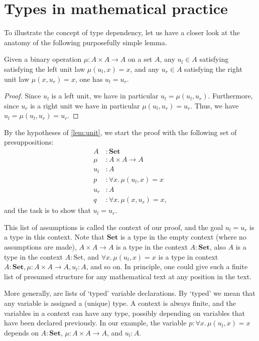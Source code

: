 \section{Types in mathematical practice}


To illustrate the concept of type dependency, let us have a closer look at the anatomy of the following purposefully simple lemma.

\begin{lem}\label{lem:unit}
Given a binary operation $\mu:A\times A\to A$ on a set $A$, any $u_l\in A$ satisfying satisfying the left unit law $\mu(u_l,x)=x$, and any $u_r\in A$ satisfying the right unit law $\mu(x,u_r)=x$, one has $u_l=u_r$. 
\end{lem}

\begin{proof}
Since $u_l$ is a left unit, we have in particular $u_l=\mu(u_l,u_r)$. Furthermore, since $u_r$ is a right unit we have in particular $\mu(u_l,u_r)=u_r$. Thus, we have $u_l=\mu(u_l,u_r)=u_r$. 
\end{proof}

\begin{samepage}
By the hypotheses of \autoref{lem:unit}, we start the proof with the following set of presuppositions:
\begin{align*}
A & : \mathbf{Set} \\
\mu & : A\times A\to A \\
u_l & : A \\
p & : \forall x.\,\mu(u_l,x)=x\\
u_r & : A \\
q & : \forall x.\,\mu(x,u_r)=x,
\end{align*}
and the task is to show that $u_l=u_r$.
\end{samepage}

This list of assumptions is called the context of our proof, and the goal $u_l=u_r$ is a type in this context. 
Note that $\mathbf{Set}$ is a type in the empty context (where no assumptions are made), $A\times A\to A$ is a type in the context $A:\mathbf{Set}$, also $A$ is a type in the context $A:\mathrm{Set}$, and $\forall x.\,\mu(u_l,x)=x$ is a type in context $A:\mathbf{Set},\mu:A\times A\to A,u_l:A$, and so on.
In principle, one could give such a finite list of presumed structure for any mathematical text at any position in the text.

More generally,  are lists of `typed' variable declarations. By `typed' we mean that any variable is assigned a (unique) type. A context is always finite, and the variables in a context can have any type, possibly depending on variables that have been declared previously. In our example, the variable $p:\forall x.\,\mu(u_l,x)=x$ depends on $A:\mathbf{Set}$, $\mu:A\times A\to A$, and $u_l:A$. 
